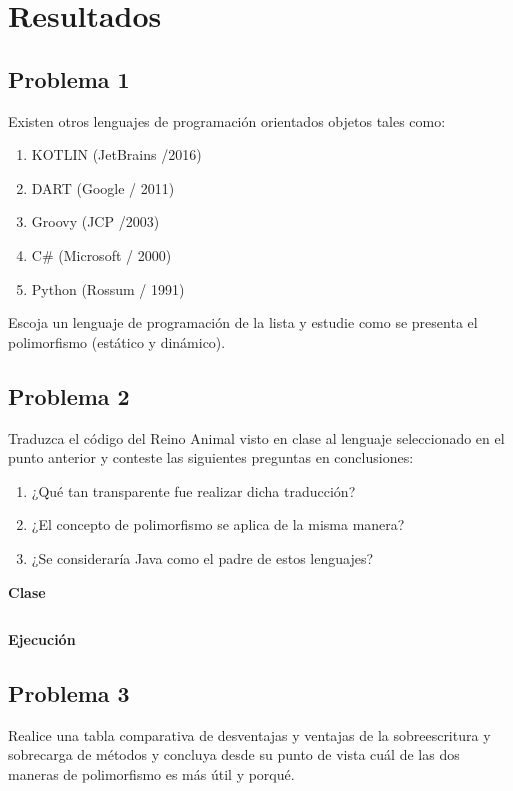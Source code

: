 \documentclass[11pt, twocolumn]{article}
\begin{document}
  \newpage
  \section*{Resultados}
  \subsection*{Problema 1}
  Existen otros lenguajes de programación orientados objetos tales como:

  \begin{enumerate}[label=\alph*.]
    \item KOTLIN (JetBrains /2016)
    \item DART (Google / 2011)
    \item Groovy (JCP /2003)
    \item C$\#$ (Microsoft / 2000)
    \item Python (Rossum / 1991)
  \end{enumerate}
  
  Escoja un lenguaje de programación de la lista y estudie como se presenta el polimorfismo (estático y dinámico).

  \subsection*{Problema 2}
  Traduzca el código del Reino Animal visto en clase al lenguaje seleccionado en el punto anterior y conteste las siguientes preguntas en conclusiones:

  \begin{enumerate}[label=\alph*.]
    \item ¿Qué tan transparente fue realizar dicha traducción?
    \item ¿El concepto de polimorfismo se aplica de la misma manera?
    \item ¿Se consideraría Java como el padre de estos lenguajes?
  \end{enumerate}

  \textbf{Clase \textit{}}
  \begin{lstlisting}[language=Java]

  \end{lstlisting}  
  
  \textbf{Ejecución}

  \subsection*{Problema 3}
  Realice una tabla comparativa de desventajas y ventajas de la sobreescritura y sobrecarga de métodos y concluya desde su punto de vista cuál de las dos maneras de polimorfismo es más útil y porqué.
  
\end{document}

